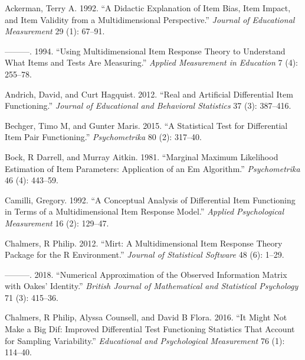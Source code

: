 \documentclass[
  11pt,
]{article}
\begin{document}
\clearpage




\hypertarget{refs}{}
\leavevmode\hypertarget{ref-ackerman1992didactic}{}%
Ackerman, Terry A. 1992. ``A Didactic Explanation of Item Bias, Item Impact, and Item Validity from a Multidimensional Perspective.'' \emph{Journal of Educational Measurement} 29 (1): 67--91.

\leavevmode\hypertarget{ref-ackerman1994using}{}%
---------. 1994. ``Using Multidimensional Item Response Theory to Understand What Items and Tests Are Measuring.'' \emph{Applied Measurement in Education} 7 (4): 255--78.

\leavevmode\hypertarget{ref-andrich2012real}{}%
Andrich, David, and Curt Hagquist. 2012. ``Real and Artificial Differential Item Functioning.'' \emph{Journal of Educational and Behavioral Statistics} 37 (3): 387--416.

\leavevmode\hypertarget{ref-bechger2015statistical}{}%
Bechger, Timo M, and Gunter Maris. 2015. ``A Statistical Test for Differential Item Pair Functioning.'' \emph{Psychometrika} 80 (2): 317--40.

\leavevmode\hypertarget{ref-bock1981marginal}{}%
Bock, R Darrell, and Murray Aitkin. 1981. ``Marginal Maximum Likelihood Estimation of Item Parameters: Application of an Em Algorithm.'' \emph{Psychometrika} 46 (4): 443--59.

\leavevmode\hypertarget{ref-camilli1992conceptual}{}%
Camilli, Gregory. 1992. ``A Conceptual Analysis of Differential Item Functioning in Terms of a Multidimensional Item Response Model.'' \emph{Applied Psychological Measurement} 16 (2): 129--47.

\leavevmode\hypertarget{ref-chalmers2012mirt}{}%
Chalmers, R Philip. 2012. ``Mirt: A Multidimensional Item Response Theory Package for the R Environment.'' \emph{Journal of Statistical Software} 48 (6): 1--29.

\leavevmode\hypertarget{ref-chalmers2018numerical}{}%
---------. 2018. ``Numerical Approximation of the Observed Information Matrix with Oakes' Identity.'' \emph{British Journal of Mathematical and Statistical Psychology} 71 (3): 415--36.

\leavevmode\hypertarget{ref-chalmers2016might}{}%
Chalmers, R Philip, Alyssa Counsell, and David B Flora. 2016. ``It Might Not Make a Big Dif: Improved Differential Test Functioning Statistics That Account for Sampling Variability.'' \emph{Educational and Psychological Measurement} 76 (1): 114--40.
\end{document}
